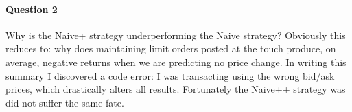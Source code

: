 \documentclass[12pt]{article}
\begin{document}
\paragraph{Question 2} Why is the Naive+ strategy underperforming the Naive strategy? Obviously this reduces to: why does maintaining limit orders posted at the touch produce, on average, negative returns when we are predicting no price change. In writing this summary I discovered a code error: I was transacting using the wrong bid/ask prices, which drastically alters all results. Fortunately the Naive++ strategy was did not suffer the same fate. 
\end{document}
